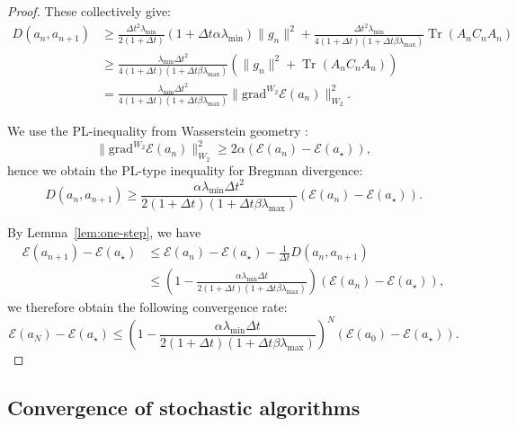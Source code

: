 \documentclass[11pt]{article}
\theoremstyle{plain}
\theoremstyle{definition}
\theoremstyle{remark}
\newcommand{\Tr}{\operatorname{Tr}}
\begin{document}
\begin{proof}
    These collectively give:
    \begin{align*}
        D (a_n, a_{n+1}) &\geq \frac{\Delta t^2 \lambda_{\min}}{2 (1 + \Delta t)} (1 + \Delta t \alpha \lambda_{\min}) \|g_n\|^2 + \frac{\Delta t^2 \lambda_{\min}}{4 (1 + \Delta t) (1 + \Delta t \beta \lambda_{\max})} \Tr (A_n C_n A_n) \\
        &\geq \frac{\lambda_{\min} \Delta t^2}{4 (1 + \Delta t) (1 + \Delta t \beta \lambda_{\max})} (\|g_n\|^2 + \Tr (A_n C_n A_n)) \\
        &= \frac{\lambda_{\min} \Delta t^2}{4 (1 + \Delta t) (1 + \Delta t \beta \lambda_{\max})} \|\mathrm{grad}^{W_2} \mathcal{E} (a_n) \|_{W_2}^2.
    \end{align*}
    
    We use the PL-inequality from Wasserstein geometry \citep[Appendix D]{lambert2022variational}:
    \begin{equation*}
        \|\mathrm{grad}^{W_2} \mathcal{E} (a_n) \|_{W_2}^2 \geq 2\alpha (\mathcal{E} (a_n) - \mathcal{E} (a_\star)),
    \end{equation*}
    hence we obtain the PL-type inequality for Bregman divergence:
    \begin{equation*}
        D (a_n, a_{n+1}) \geq \frac{\alpha\lambda_{\min} \Delta t^2}{2 (1 + \Delta t) (1 + \Delta t \beta \lambda_{\max})} (\mathcal{E} (a_n) - \mathcal{E} (a_\star)).
    \end{equation*}
    
    By Lemma~\ref{lem:one-step}, we have
    \begin{align*}
        \mathcal{E} (a_{n+1}) - \mathcal{E} (a_\star) &\leq \mathcal{E} (a_n) - \mathcal{E} (a_\star) - \frac{1}{\Delta t} D (a_{n}, a_{n+1}) \\
        &\leq \left(1 - \frac{\alpha\lambda_{\min} \Delta t}{2 (1 + \Delta t) (1 + \Delta t \beta \lambda_{\max})} \right) (\mathcal{E} (a_n) - \mathcal{E} (a_\star)),
    \end{align*}
    we therefore obtain the following convergence rate:
    \begin{equation*}
        \mathcal{E} (a_N) - \mathcal{E} (a_\star) \leq \left(1 - \frac{\alpha\lambda_{\min} \Delta t}{2 (1 + \Delta t) (1 + \Delta t \beta \lambda_{\max})} \right)^N (\mathcal{E} (a_0) - \mathcal{E} (a_\star)).
    \end{equation*}
\end{proof}


\subsection{Convergence of stochastic algorithms}
\end{document}
